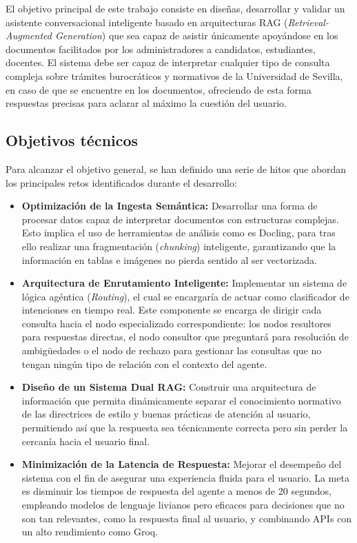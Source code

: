 \documentclass[12pt,a4paper,oneside]{report}
\begin{document}
El objetivo principal de este trabajo consiste en diseñas, desarrollar y validar un asistente conversacional inteligente basado en arquitecturas RAG (\textit{Retrieval-Augmented Generation}) que sea capaz de asistir únicamente apoyándose en los documentos facilitados por los administradores a candidatos, estudiantes, docentes. El sistema debe ser capaz de interpretar cualquier tipo de consulta compleja sobre trámites burocráticos y normativos de la Universidad de Sevilla, en caso de que se encuentre en los documentos, ofreciendo de esta forma respuestas precisas para aclarar al máximo la cuestión del usuario.

\subsection{Objetivos técnicos}

Para alcanzar el objetivo general, se han definido una serie de hitos que abordan los principales retos identificados durante el desarrollo:

\begin{itemize}
    \item \textbf{Optimización de la Ingesta Semántica:} Desarrollar una forma de procesar datos capaz de interpretar documentos con estructuras complejas. Esto implica el uso de herramientas de análisis como es Docling, para tras ello realizar una fragmentación (\textit{chunking}) inteligente, garantizando que la información en tablas e imágenes no pierda sentido al ser vectorizada.

    \item \textbf{Arquitectura de Enrutamiento Inteligente:} Implementar un sistema de lógica agéntica (\textit{Routing}), el cual se encargaría de actuar como clasificador de intenciones en tiempo real. Este componente se encarga de dirigir cada consulta hacia el nodo especializado correspondiente: los nodos resultores para respuestas directas, el nodo consultor que preguntará para resolución de ambigüedades o el nodo de rechazo para gestionar las consultas que no tengan ningún tipo de relación con el contexto del agente.

    \item \textbf{Diseño de un Sistema Dual RAG:} Construir una arquitectura de información que permita dinámicamente separar el conocimiento normativo de las directrices de estilo y buenas prácticas de atención al usuario, permitiendo así que la respuesta sea técnicamente correcta pero sin perder la cercanía hacia el usuario final.

    \item \textbf{Minimización de la Latencia de Respuesta:} Mejorar el desempeño del sistema con el fin de asegurar una experiencia fluida para el usuario. La meta es disminuir los tiempos de respuesta del agente a menos de 20 segundos, empleando modelos de lenguaje livianos pero eficaces para decisiones que no son tan relevantes, como la respuesta final al usuario, y combinando APIs con un alto rendimiento como Groq.
\end{itemize}
\end{document}
